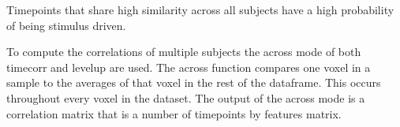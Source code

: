 

Timepoints that share high similarity across all subjects have a high probability of being stimulus driven.

To compute the correlations of multiple subjects the across mode of both timecorr and levelup are used. The across function compares one voxel in a sample to the averages of that voxel in the rest of the dataframe. This occurs throughout every voxel in the dataset. The output of the across mode is a correlation matrix that is a number of timepoints by features matrix.

